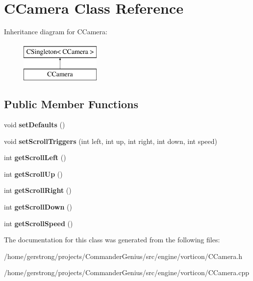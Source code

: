 \hypertarget{class_c_camera}{
\section{CCamera Class Reference}
\label{class_c_camera}
}
Inheritance diagram for CCamera:\begin{figure}[H]
\begin{center}
\leavevmode
\includegraphics[height=2cm]{class_c_camera}
\end{center}
\end{figure}
\subsection*{Public Member Functions}
\begin{DoxyCompactItemize}
\item 
\hypertarget{class_c_camera_ad32085a0238e46e16bad6739202b1745}{
void {\bfseries setDefaults} ()}
\label{class_c_camera_ad32085a0238e46e16bad6739202b1745}

\item 
\hypertarget{class_c_camera_a34cff878a98d8a626b29626a43d8b7c0}{
void {\bfseries setScrollTriggers} (int left, int up, int right, int down, int speed)}
\label{class_c_camera_a34cff878a98d8a626b29626a43d8b7c0}

\item 
\hypertarget{class_c_camera_ab009194106f77974cc996119ec072ac5}{
int {\bfseries getScrollLeft} ()}
\label{class_c_camera_ab009194106f77974cc996119ec072ac5}

\item 
\hypertarget{class_c_camera_ab48f6dd1fb10eaa4b8e3d46f3e170810}{
int {\bfseries getScrollUp} ()}
\label{class_c_camera_ab48f6dd1fb10eaa4b8e3d46f3e170810}

\item 
\hypertarget{class_c_camera_ab998cbf52e4d7ccc4b5585603769cc5d}{
int {\bfseries getScrollRight} ()}
\label{class_c_camera_ab998cbf52e4d7ccc4b5585603769cc5d}

\item 
\hypertarget{class_c_camera_af2d3d0af5a83fc0ed50d770ed3395ae0}{
int {\bfseries getScrollDown} ()}
\label{class_c_camera_af2d3d0af5a83fc0ed50d770ed3395ae0}

\item 
\hypertarget{class_c_camera_acd53787498c5e81ebb2798c728e41177}{
int {\bfseries getScrollSpeed} ()}
\label{class_c_camera_acd53787498c5e81ebb2798c728e41177}

\end{DoxyCompactItemize}


The documentation for this class was generated from the following files:\begin{DoxyCompactItemize}
\item 
/home/gerstrong/projects/CommanderGenius/src/engine/vorticon/CCamera.h\item 
/home/gerstrong/projects/CommanderGenius/src/engine/vorticon/CCamera.cpp\end{DoxyCompactItemize}

